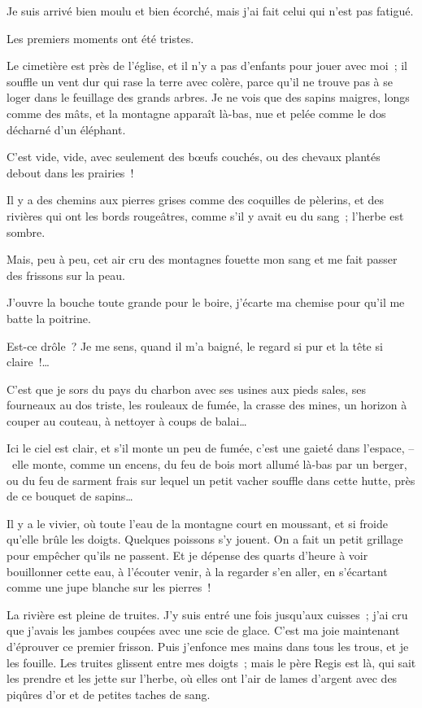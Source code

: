 \documentclass[french,twoside]{book} %
\begin{document}
\noindent Je suis arrivé bien moulu et bien écorché, mais j’ai fait celui qui n’est pas fatigué.\par
\bigbreak
\noindent Les premiers moments ont été tristes.\par
\bigbreak
\noindent Le cimetière est près de l’église, et il n’y a pas d’enfants pour jouer avec moi ; il souffle un vent dur qui rase la terre avec colère, parce qu’il ne trouve pas à se loger dans le feuillage des grands arbres. Je ne vois que des sapins maigres, longs comme des mâts, et la montagne apparaît là-bas, nue et pelée comme le dos décharné d’un éléphant.\par
C’est vide, vide, avec seulement des bœufs couchés, ou des chevaux plantés debout dans les prairies !\par
Il y a des chemins aux pierres grises comme des coquilles de pèlerins, et des rivières qui ont les bords rougeâtres, comme s’il y avait eu du sang ; l’herbe est sombre.\par
Mais, peu à peu, cet air cru des montagnes fouette mon sang et me fait passer des frissons sur la peau.\par
J’ouvre la bouche toute grande pour le boire, j’écarte ma chemise pour qu’il me batte la poitrine.\par
Est-ce drôle ? Je me sens, quand il m’a baigné, le regard si pur et la tête si claire !…\par
C’est que je sors du pays du charbon avec ses usines aux pieds sales, ses fourneaux au dos triste, les rouleaux de fumée, la crasse des mines, un horizon à couper au couteau, à nettoyer à coups de balai…\par
Ici le ciel est clair, et s’il monte un peu de fumée, c’est une gaieté dans l’espace, – elle monte, comme un encens, du feu de bois mort allumé là-bas par un berger, ou du feu de sarment frais sur lequel un petit vacher souffle dans cette hutte, près de ce bouquet de sapins…\par
Il y a le vivier, où toute l’eau de la montagne court en moussant, et si froide qu’elle brûle les doigts. Quelques poissons s’y jouent. On a fait un petit grillage pour empêcher qu’ils ne passent. Et je dépense des quarts d’heure à voir bouillonner cette eau, à l’écouter venir, à la regarder s’en aller, en s’écartant comme une jupe blanche sur les pierres !\par
La rivière est pleine de truites. J’y suis entré une fois jusqu’aux cuisses ; j’ai cru que j’avais les jambes coupées avec une scie de glace. C’est ma joie maintenant d’éprouver ce premier frisson. Puis j’enfonce mes mains dans tous les trous, et je les fouille. Les truites glissent entre mes doigts ; mais le père Regis est là, qui sait les prendre et les jette sur l’herbe, où elles ont l’air de lames d’argent avec des piqûres d’or et de petites taches de sang.\par
\end{document}
